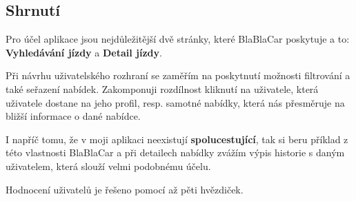 
\newpage
\subsection{Shrnutí}
Pro účel aplikace jsou nejdůležitější dvě stránky, které BlaBlaCar poskytuje a to: \textbf{Vyhledávání jízdy} a \textbf{Detail jízdy}.

Při návrhu uživatelského rozhraní se zaměřím na poskytnutí možnosti filtrování a také seřazení nabídek. Zakomponuji rozdílnost kliknutí na uživatele, která uživatele dostane na jeho profil, resp. samotné nabídky, která nás přesměruje na bližší informace o dané nabídce.

I napříč tomu, že v moji aplikaci neexistují \textbf{spolucestující}, tak si beru příklad z této vlastnosti BlaBlaCar a při detailech nabídky zvážím výpis historie s daným uživatelem, která slouží velmi podobnému účelu.

Hodnocení uživatelů je řešeno pomocí až pěti hvězdiček.